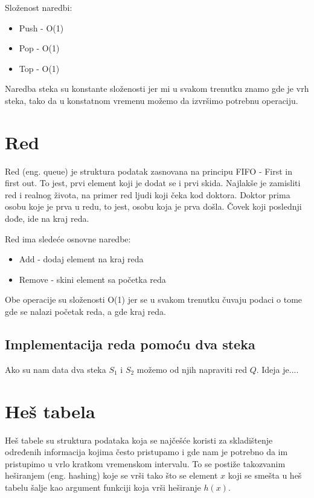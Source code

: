 \documentclass{memoir}
\begin{document}
Složenost naredbi:
\begin{itemize}
 \item Push - O(1)
 \item Pop - O(1)
 \item Top - O(1)
\end{itemize}

Naredba steka su konstante složenosti jer mi u svakom trenutku znamo gde je vrh steka, tako da u konstatnom vremenu 
možemo da izvršimo potrebnu operaciju.


\section{Red}
Red (eng. queue) je struktura podatak zasnovana na principu FIFO - First in first out. To jest, prvi element koji je 
dodat se i prvi skida. Najlakše je zamisliti red i realnog života, na primer red ljudi koji čeka kod doktora. Doktor 
prima osobu koje je prva u redu, to jest, osobu koja je prva došla. Čovek koji poslednji dođe, ide na kraj reda.

Red ima sledeće osnovne naredbe:
\begin{itemize}
 \item Add - dodaj element na kraj reda
 \item Remove - skini element sa početka reda
\end{itemize}

Obe operacije su složenosti O(1) jer se u svakom trenutku čuvaju podaci o tome gde se nalazi početak reda, a gde kraj 
reda.

\subsection{Implementacija reda pomoću dva steka}
Ako su nam data dva steka $S_1$ i $S_2$ možemo od njih napraviti red $Q$. Ideja je....

\section{Heš tabela}
Heš tabele su struktura podataka koja se najčešće koristi za skladištenje određenih informacija kojima često pristupamo 
i gde nam je potrebno da im pristupimo u vrlo kratkom vremenskom intervalu. To se postiže takozvanim heširanjem (eng. 
hashing) koje se vrši tako što se element $x$ koji se smešta u heš tabelu šalje kao argument funkciji koja vrši 
heširanje $h(x)$.
\end{document}
